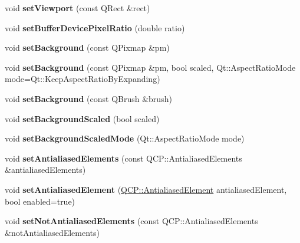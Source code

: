 \begin{DoxyCompactItemize}
void {\bfseries set\+Viewport} (const Q\+Rect \&rect)
\item 
\mbox{\label{class_q_custom_plot_a159162653ad6f8b8bf21263ba5787215}} 
void {\bfseries set\+Buffer\+Device\+Pixel\+Ratio} (double ratio)
\item 
\mbox{\label{class_q_custom_plot_a130358592cfca353ff3cf5571b49fb00}} 
void {\bfseries set\+Background} (const Q\+Pixmap \&pm)
\item 
\mbox{\label{class_q_custom_plot_a8513971d6aa24d8b0d6a68d45b542130}} 
void {\bfseries set\+Background} (const Q\+Pixmap \&pm, bool scaled, Qt\+::\+Aspect\+Ratio\+Mode mode=Qt\+::\+Keep\+Aspect\+Ratio\+By\+Expanding)
\item 
\mbox{\label{class_q_custom_plot_a8ed256cf467bfa7ba1f9feaae62c3bd0}} 
void {\bfseries set\+Background} (const Q\+Brush \&brush)
\item 
\mbox{\label{class_q_custom_plot_a36f0fa1317325dc7b7efea615ee2de1f}} 
void {\bfseries set\+Background\+Scaled} (bool scaled)
\item 
\mbox{\label{class_q_custom_plot_a4c0eb4865b7949f62e1cb97db04a3de0}} 
void {\bfseries set\+Background\+Scaled\+Mode} (Qt\+::\+Aspect\+Ratio\+Mode mode)
\item 
\mbox{\label{class_q_custom_plot_af6f91e5eab1be85f67c556e98c3745e8}} 
void {\bfseries set\+Antialiased\+Elements} (const Q\+C\+P\+::\+Antialiased\+Elements \&antialiased\+Elements)
\item 
\mbox{\label{class_q_custom_plot_aeef813bcf7efab8e765f9f87ec454691}} 
void {\bfseries set\+Antialiased\+Element} (\hyperlink{namespace_q_c_p_ae55dbe315d41fe80f29ba88100843a0c}{Q\+C\+P\+::\+Antialiased\+Element} antialiased\+Element, bool enabled=true)
\item 
\mbox{\label{class_q_custom_plot_ae10d685b5eabea2999fb8775ca173c24}} 
void {\bfseries set\+Not\+Antialiased\+Elements} (const Q\+C\+P\+::\+Antialiased\+Elements \&not\+Antialiased\+Elements)
\item 

\end{DoxyCompactItemize}
